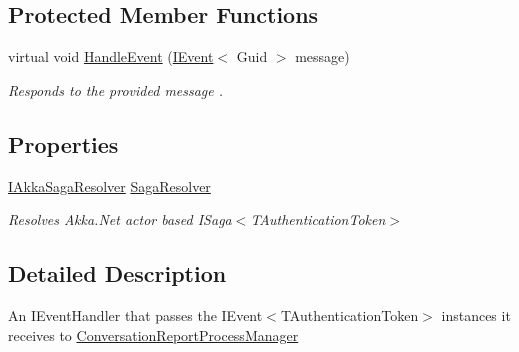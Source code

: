 \subsection*{Protected Member Functions}
\begin{DoxyCompactItemize}
\item 
virtual void \hyperlink{classCqrs_1_1Akka_1_1Tests_1_1Unit_1_1Sagas_1_1ConversationReportProcessManagerEventHandlers_a51207786638b00eaae1cae24d0053822_a51207786638b00eaae1cae24d0053822}{Handle\+Event} (\hyperlink{interfaceCqrs_1_1Events_1_1IEvent}{I\+Event}$<$ Guid $>$ message)
\begin{DoxyCompactList}\small\item\em Responds to the provided {\itshape message} . \end{DoxyCompactList}\end{DoxyCompactItemize}
\subsection*{Properties}
\begin{DoxyCompactItemize}
\item 
\hyperlink{interfaceCqrs_1_1Akka_1_1Domain_1_1IAkkaSagaResolver}{I\+Akka\+Saga\+Resolver} \hyperlink{classCqrs_1_1Akka_1_1Tests_1_1Unit_1_1Sagas_1_1ConversationReportProcessManagerEventHandlers_ab9316a7764bc962834f03fa32cd1fe28_ab9316a7764bc962834f03fa32cd1fe28}{Saga\+Resolver}
\begin{DoxyCompactList}\small\item\em Resolves Akka.\+Net actor based I\+Saga$<$\+T\+Authentication\+Token$>$ \end{DoxyCompactList}\end{DoxyCompactItemize}


\subsection{Detailed Description}
An I\+Event\+Handler that passes the I\+Event$<$\+T\+Authentication\+Token$>$ instances it receives to \hyperlink{classCqrs_1_1Akka_1_1Tests_1_1Unit_1_1Sagas_1_1ConversationReportProcessManager}{Conversation\+Report\+Process\+Manager} 




